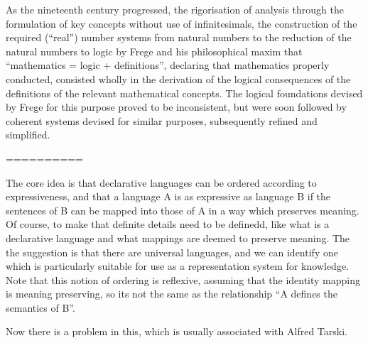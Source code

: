 As the nineteenth century progressed, the rigorisation of analysis through the formulation of key concepts without use of infinitesimals, the construction of the required (``real'') number systems from natural numbers to the reduction of the natural numbers to logic by Frege and his philosophical maxim that ``mathematics = logic + definitions'', declaring that mathematics properly conducted, consisted wholly in the derivation of the logical consequences of the definitions of the relevant mathematical concepts.
The logical foundations devised by Frege for this purpose proved to be inconsistent, but were soon followed by coherent  systems devised for similar purposes, subsequently refined and simplified.

==========

The core idea is that declarative languages can be ordered according to expressiveness, and that a language A is as expressive as language B if the sentences of B can be mapped into those of A in a way which preserves meaning.
Of course, to make that definite details need to be definedd, like what is a declarative language and what mappings are deemed to preserve meaning.
The the suggestion is that there are universal languages, and we can identify one which is particularly suitable for use as a representation system for knowledge.
Note that this notion of ordering is reflexive, assuming that the identity mapping is meaning preserving, so its not the same as the relationship ``A defines the semantics of B''.

Now there is a problem in this, which is usually associated with Alfred Tarski.
